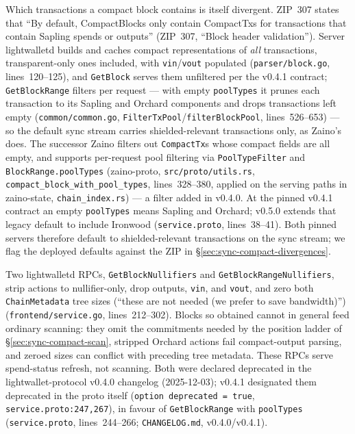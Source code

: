\documentclass[11pt,a4paper]{article}
\theoremstyle{definition}
\begin{document}
Which transactions a compact block contains is itself divergent. ZIP~307
states that ``By default, CompactBlocks only contain CompactTxs for
transactions that contain Sapling spends or outputs'' (ZIP~307, ``Block
header validation''). Server \textsf{lightwalletd} builds and caches
compact representations of \emph{all} transactions, transparent-only ones
included, with \texttt{vin}/\texttt{vout} populated
(\texttt{parser/block.go}, lines~120--125), and \texttt{GetBlock} serves
them unfiltered per the v0.4.1 contract; \texttt{GetBlockRange} filters
per request --- with empty \texttt{poolTypes} it prunes each transaction
to its Sapling and Orchard components and drops transactions left empty
(\texttt{common/common.go},
\texttt{FilterTxPool}/\texttt{filterBlockPool}, lines~526--653) --- so
the default sync stream carries shielded-relevant transactions only, as
Zaino's does. The successor \textsf{Zaino}
filters out \texttt{CompactTx}s whose
compact fields are all empty, and supports per-request pool filtering via
\texttt{PoolTypeFilter} and \texttt{BlockRange.poolTypes}
(\textsf{zaino-proto}, \texttt{src/proto/utils.rs},
\texttt{compact\_block\_with\_pool\_types}, lines~328--380, applied on
the serving paths in \textsf{zaino-state}, \texttt{chain\_index.rs}) ---
a filter added
in v0.4.0. At the pinned v0.4.1 contract an empty \texttt{poolTypes}
means Sapling and Orchard; v0.5.0 extends that legacy default to include
Ironwood (\texttt{service.proto}, lines~38--41). Both pinned servers
therefore default to shielded-relevant transactions on the sync stream;
we flag the deployed defaults against the ZIP in
\S\ref{sec:sync-compact-divergences}.

Two \textsf{lightwalletd} RPCs, \texttt{GetBlockNullifiers} and
\texttt{GetBlockRangeNullifiers}, strip actions to nullifier-only, drop
outputs, \texttt{vin}, and \texttt{vout}, and zero both
\texttt{ChainMetadata} tree sizes (``these are not needed (we prefer to
save bandwidth)'') (\texttt{frontend/service.go}, lines~212--302). Blocks
so obtained cannot in general feed ordinary scanning: they omit the
commitments needed by the position ladder of
\S\ref{sec:sync-compact-scan}, stripped Orchard actions fail
compact-output parsing, and zeroed sizes can conflict with preceding
tree metadata. These RPCs serve spend-status refresh, not scanning.
Both were declared deprecated
in the \textsf{lightwallet-protocol} v0.4.0 changelog (2025-12-03);
v0.4.1 designated them deprecated in the proto itself
(\texttt{option deprecated = true}, \texttt{service.proto:247,267}), in
favour of \texttt{GetBlockRange} with \texttt{poolTypes}
(\texttt{service.proto}, lines~244--266;
\texttt{CHANGELOG.md}, v0.4.0/v0.4.1).
\end{document}
